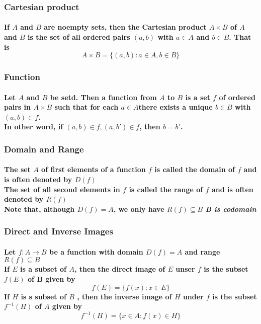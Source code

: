 \documentclass{article}
\begin{document}
            \subsubsection{Cartesian product}
            \paragraph{If $A$ and $B$ are noempty sets, then the \textbf{Cartesian product} $A \times B$ of $A$ and $B$ is the set of all ordered pairs $(a,b)$ with $a\in A$ and $b\in B$. That is 
            $$A\times B = \{(a,b):a\in A,b\in B\}$$}
                

            \subsubsection{Function}
            \paragraph{Let $A$ and $B$ be setd. Then a \textbf{function} from $A$ to $B$ is a set $f$ of ordered pairs in $A\times B$ such that for each $a\in A$there exists a unique $b\in B$ with $(a,b)\in f$.
            \\
            In other word, if $(a,b)\in f,(a,b')\in f$, then $b=b'$.}
                
            \subsubsection{Domain and Range}
            \paragraph{The set $A$ of first elements of a function $f$ is called the \textbf{domain} of $f$ and is often denoted by $D(f)$
            \\
            The set of all second elements in $f$ is called the \textbf{range} of $f$ and is often denoted by $R(f)$
            \\
            \textbf{Note that}, although $D(f)=A$, we only have $R(f)\subseteq B$
            \textit{B is codomain}
            }

            \subsubsection{Direct and Inverse Images}
            \paragraph{
                Let $f:A\rightarrow B$ be a function with domain $D(f)=A$ and range $R(f)\subseteq B$
                \\
                If $E$ is a subset of $A$, then the \textbf{direct image} of $E$ unser $f$ is the subset $f(E)$ of B given by
                $$ f(E)=\{f(x):x\in E\}$$
                If $H$ is s subset of $B$ , then the \textbf{inverse image} of $H$ under $f$ is the subset $f^{-1}(H)$ of $A$ given by 
                $$ f^{-1}(H)=\{x\in A : f(x)\in H\}$$
            }
\end{document}
